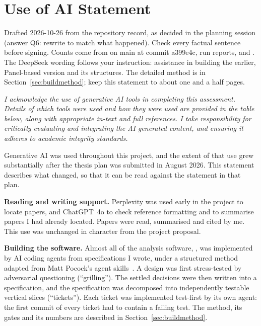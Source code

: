 \chapter{Use of AI Statement}
\label{ch:aiuse}

\begin{instructions}
Drafted 2026-10-26 from the repository record, as decided in the planning session (answer Q6: rewrite to match what
happened). Check every factual sentence before signing. Counts come from  on main at commit a399e4c,
 run reports, and . The DeepSeek wording follows your instruction: assistance in
building the earlier, Panel-based version and its structures. The detailed method is in Section~\ref{sec:buildmethod};
keep this statement to about one and a half pages.
\end{instructions}

\emph{I acknowledge the use of generative AI tools in completing this
assessment. Details of which tools were used and how they were used are
provided in the table below, along with appropriate in-text and full
references. I take responsibility for critically evaluating and
integrating the AI generated content, and ensuring it adheres to
academic integrity standards.}

\bigskip

Generative AI was used throughout this project, and the extent of that use grew substantially after the thesis plan was submitted in August 2026. This statement describes what changed, so that it can be read against the statement in that plan.

\textbf{Reading and writing support.} Perplexity was used early in the project to locate papers, and ChatGPT~4o to check reference formatting and to summarise papers I had already located. Papers were read, summarised and cited by me. This use was unchanged in character from the project proposal.

\textbf{Building the software.} Almost all of the analysis software, \tool{}, was implemented by AI coding agents from specifications I wrote, under a structured method adapted from Matt Pocock's agent skills~\cite{pocockskills}. A design was first stress-tested by adversarial questioning (``grilling''). The settled decisions were then written into a specification, and the specification was decomposed into independently testable vertical slices (``tickets''). Each ticket was implemented test-first by its own agent: the first commit of every ticket had to contain a failing test. The method, its gates and its numbers are described in Section~\ref{sec:buildmethod}.

